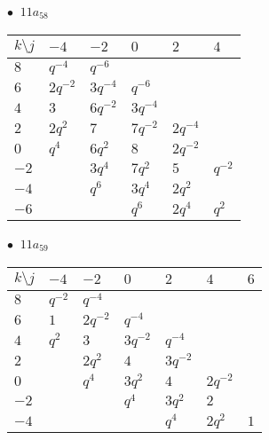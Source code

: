 \begin{minipage}{\linewidth}
$\bullet\ $ $11a_{58}$ \vspace{0.5em} \\
\begin{tabular}{l|lllll}
$k \setminus j$ & $-4$ & $-2$ & $0$ & $2$ & $4$ \\
\hline
$8$ & $q^{-4}$ & $q^{-6}$ &  &  &  \\
$6$ & $2q^{-2}$ & $3q^{-4}$ & $q^{-6}$ &  &  \\
$4$ & $3$ & $6q^{-2}$ & $3q^{-4}$ &  &  \\
$2$ & $2q^{2}$ & $7$ & $7q^{-2}$ & $2q^{-4}$ &  \\
$0$ & $q^{4}$ & $6q^{2}$ & $8$ & $2q^{-2}$ &  \\
$-2$ &  & $3q^{4}$ & $7q^{2}$ & $5$ & $q^{-2}$ \\
$-4$ &  & $q^{6}$ & $3q^{4}$ & $2q^{2}$ &  \\
$-6$ &  &  & $q^{6}$ & $2q^{4}$ & $q^{2}$ \\
\end{tabular}
\vspace{2em}
\end{minipage}
%
\begin{minipage}{\linewidth}
$\bullet\ $ $11a_{59}$ \vspace{0.5em} \\
\begin{tabular}{l|llllll}
$k \setminus j$ & $-4$ & $-2$ & $0$ & $2$ & $4$ & $6$ \\
\hline
$8$ & $q^{-2}$ & $q^{-4}$ &  &  &  &  \\
$6$ & $1$ & $2q^{-2}$ & $q^{-4}$ &  &  &  \\
$4$ & $q^{2}$ & $3$ & $3q^{-2}$ & $q^{-4}$ &  &  \\
$2$ &  & $2q^{2}$ & $4$ & $3q^{-2}$ &  &  \\
$0$ &  & $q^{4}$ & $3q^{2}$ & $4$ & $2q^{-2}$ &  \\
$-2$ &  &  & $q^{4}$ & $3q^{2}$ & $2$ &  \\
$-4$ &  &  &  & $q^{4}$ & $2q^{2}$ & $1$ \\
\end{tabular}
\vspace{2em}
\end{minipage}
%
